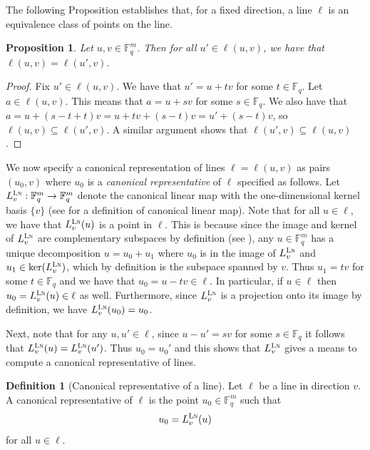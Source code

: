 \documentclass[11pt]{article}
\newtheorem{proposition}[theorem]{Proposition}
\theoremstyle{definition}
\newtheorem{definition}[theorem]{Definition}
\newcommand{\F}{\ensuremath{\mathbb{F}}}
\newcommand{\labelstyle}[1]{\ensuremath{\textsc{#1}}\xspace}
\newcommand{\lnf}{\labelstyle{Ln}}
\renewcommand{\line}{\mathbf{\ell}}
\begin{document}
The following Proposition establishes that, for a fixed direction, a line
$\line$ is an equivalence class of points on the line.
\begin{proposition}
  \label{prop:line-equiv}
  Let $u,v \in \F_q^m$.
  Then for all $u' \in \line(u,v)$, we have that $\line(u,v) = \line(u',v)$.
\end{proposition}
\begin{proof}
	Fix $u' \in \line(u,v)$.
  We have that $u' = u + tv$ for some $t \in \F_q$.
  Let $a \in \line(u,v)$.
  This means that $a = u + sv$ for some $s\in \F_q$.
  We also have that $a = u + (s - t + t)v = u + tv + (s - t)v = u' + (s - t)v$,
  so $\line(u,v) \subseteq \line(u',v)$.
  A similar argument shows that $\line(u',v) \subseteq \line(u,v)$.
\end{proof}

We now specify a canonical representation of lines $\line = \line(u,v)$ as pairs $(u_0,v)$
where $u_0$ is a \emph{canonical representative} of $\line$ specified as
follows.
Let $L_v^{\lnf}: \F_q^m \to \F_q^m$ denote the canonical linear map with the
one-dimensional kernel basis $\{v\}$ (see  for a
definition of canonical linear map).
Note that for all $u \in \line$, we have that $L_v^{\lnf}(u)$ is a point in
$\line$.
This is because since the image and kernel of $L_v^{\lnf}$ are complementary
subspaces by definition (see ), any $u \in \F_q^m$ has a
unique decomposition $u = u_0 + u_1$ where $u_0$ is in the image of $L_v^{\lnf}$
and $u_1 \in \ker(L_v^{\lnf})$, which by definition is the subspace spanned by
$v$.
Thus $u_1 = tv$ for some $t \in \F_q$ and we have that $u_0 = u - tv \in \line$.
In particular, if $u\in \line$ then $u_0 = L_v^{\lnf}(u) \in \line$ as well. 
Furthermore, since $L_v^{\lnf}$ is a projection onto its image by definition, we
have $L_v^{\lnf}(u_0) = u_0$.

Next, note that for any $u,u' \in \line$, since $u-u' = sv$ for some $s\in \F_q$
it follows that $L_v^\lnf(u) = L_v^\lnf(u')$.
Thus $u_0 = u_0'$ and this shows that $L_v^\lnf$ gives a means to compute a
canonical representative of lines.

\begin{definition}[Canonical representative of a line]
  \label{def:line-representative}
  Let $\line$ be a line in direction $v$.
  A canonical representative of $\line$ is the point $u_0 \in \F_q^m$ such that
  \[
    u_0 = L_v^\lnf(u)
  \]
  for all $u \in \line$.
\end{definition}
\end{document}

